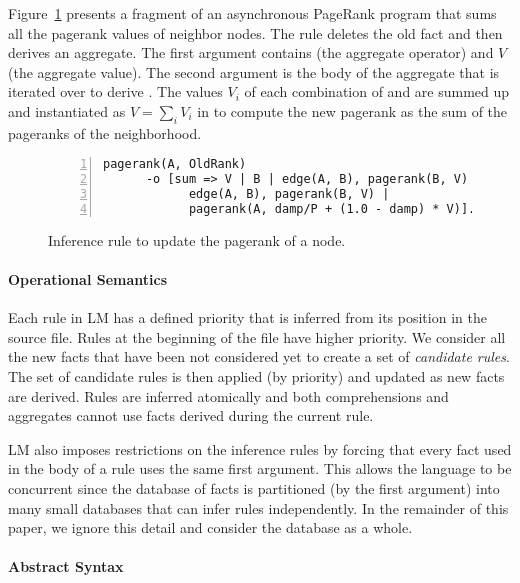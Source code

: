 Figure~\ref{code:pagerank} presents a fragment of an asynchronous PageRank
program that sums all the pagerank values of neighbor nodes. The rule deletes
the old  fact and then derives an aggregate. The first argument
contains  (the aggregate operator) and $V$ (the aggregate value). The
second argument  is the body of the aggregate
that is iterated over to derive . The values
$V_i$ of each combination of  and  are summed up and
instantiated as $V = \sum_i V_i$ in  to compute the new pagerank as the sum of the pageranks of the
neighborhood.

\begin{figure}[h]
\begin{Verbatim}[numbers=left,fontsize=\stuffsize,xleftmargin=\stuffleftmargin]
pagerank(A, OldRank)
      -o [sum => V | B | edge(A, B), pagerank(B, V) |
            edge(A, B), pagerank(B, V) |
            pagerank(A, damp/P + (1.0 - damp) * V)].
\end{Verbatim}
   \caption{Inference rule to update the pagerank of a node.}
   \label{code:pagerank}
\vspace{-5mm}
\end{figure}

\paragraph{Operational Semantics} Each rule in LM has a defined priority that is
inferred from its position in the source file.  Rules at the beginning of the
file have higher priority. We consider all the new facts that have been not
considered yet to create a set of \emph{candidate rules}.  The set of candidate
rules is then applied (by priority) and updated as new facts are derived.  Rules
are inferred atomically and both comprehensions and aggregates cannot use facts
derived during the current rule.

LM also imposes restrictions on the inference rules by forcing that every fact
used in the body of a rule uses the same first argument. This allows the
language to be concurrent since the database of facts is partitioned (by the
first argument) into many small databases that can infer rules independently.
In the remainder of this paper, we ignore this detail and consider the database
as a whole.

\paragraph{Abstract Syntax} 

